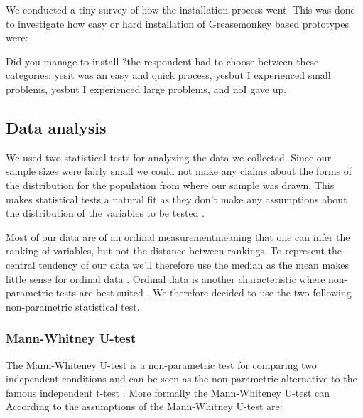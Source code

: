 We conducted a tiny survey of how the installation process went. This
was done to investigate how easy or hard installation of Greasemonkey based
prototypes were:

\begin{items}
  \item Did you manage to install \latest{}?\dash{}the respondent had to
  choose between these categories: yes\dash{}it was an easy and quick process,
  yes\dash{}but I experienced small problems, yes\dash{}but I experienced
  large problems, and no\dash{}I gave up.
\end{items}

\subsection{Data analysis}

We used two statistical tests for analyzing the data we collected.
Since our sample sizes were fairly small we could not make any claims
about the forms of the distribution for the \urort{} population
from where our sample was drawn.
This makes
 statistical tests a natural fit as they don't make any
assumptions about the distribution of the variables to be tested
\citep[]{siegel88}.

Most of our data are of an ordinal measurement\dash{}meaning that one can
infer the ranking of variables, but not the distance between rankings.
To represent the central tendency of our data we'll therefore use the median
as the mean makes little sense for ordinal data
\citep[]{siegel88}.
Ordinal data is another characteristic where non-parametric tests
are best suited \citep[]{siegel88}. We therefore decided
to use the two following non-parametric statistical test.

\subsubsection{Mann-Whitney U-test}

The Mann-Whiteney U-test is a non-parametric test for comparing two
independent conditions and can be seen as the non-parametric alternative to
the famous independent t-test \citep[]{field05}.
More formally the Mann-Whiteney U-test can
According to \citet[]{lowry08} the assumptions of the
Mann-Whitney U-test are:

